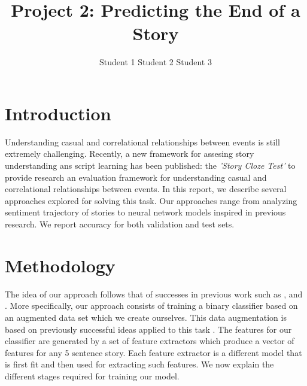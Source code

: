 \documentclass{article}
\title{Project 2: Predicting the End of a Story}
\author{Student 1 \qquad Student 2 \qquad Student 3}
\begin{document}

\maketitle



\section{Introduction}
\label{sec:intro}

Understanding casual and correlational relationships between events is
still extremely challenging. Recently, a new framework for assesing story
understanding ans script learning has been published: the {\it 'Story Cloze
    Test'} to provide research an evaluation framework for understanding casual
and correlational relationships between events. In this report, we describe
several approaches explored for solving this task. Our approaches
range from analyzing sentiment trajectory of stories to neural network models
inspired in previous research. We report accuracy for both validation
and test sets.


\section{Methodology}
\label{sec:general}

The idea of our approach follows that of successes in previous work such as
\cite{UWNLP}, \cite{Goel} and \cite{COGCOMP}. More specifically, our approach
consists of training a binary classifier based on an augmented data set which we
create ourselves. This data augmentation is based on previously successful ideas
applied to this task \cite{LSTMClassifier, SENTENCE_EMB}.  The features for our
classifier are generated by a set of feature extractors which produce a vector
of features for any 5 sentence story. Each feature extractor is a different
model that is first fit and then used for extracting such features. We now 
explain the different stages required for training our model.
\end{document}
